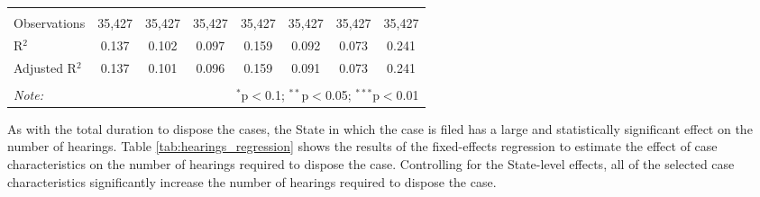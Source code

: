 \begin{table}[!ht]
{\begin{tabular}{lccccccc}
      \hline \\[-1.8ex] 
      Observations & 35,427 & 35,427 & 35,427 & 35,427 & 35,427 & 35,427 & 35,427 \\ 
      R$^{2}$ & 0.137 & 0.102 & 0.097 & 0.159 & 0.092 & 0.073 & 0.241 \\ 
      Adjusted R$^{2}$ & 0.137 & 0.101 & 0.096 & 0.159 & 0.091 & 0.073 & 0.241 \\
      \hline \\[-1.8ex] 
      \textit{Note:}  & \multicolumn{7}{r}{$^{*}$p$<$0.1; $^{**}$p$<$0.05; $^{***}$p$<$0.01} \\ 
    \end{tabular}}
\end{table}

As with the total duration to dispose the cases, the State in which the case is filed has a large and statistically significant effect on the number of hearings. Table \ref{tab:hearings_regression} shows the results of the fixed-effects regression to estimate the effect of case characteristics on the number of hearings required to dispose the case. Controlling for the State-level effects, all of the selected case characteristics significantly increase the number of hearings required to dispose the case.

